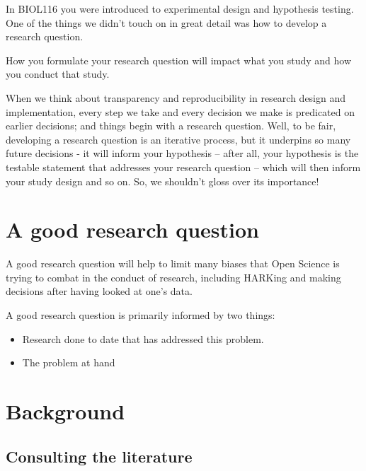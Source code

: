 \documentclass[
]{book}
\providecommand{\tightlist}{%
  \setlength{\itemsep}{0pt}\setlength{\parskip}{0pt}}
\begin{document}
In BIOL116 you were introduced to experimental design and hypothesis testing. One of the things we didn't touch on in great detail was how to develop a research question.

How you formulate your research question will impact what you study and how you conduct that study.

When we think about transparency and reproducibility in research design and implementation, every step we take and every decision we make is predicated on earlier decisions; and things begin with a research question. Well, to be fair, developing a research question is an iterative process, but it underpins so many future decisions - it will inform your hypothesis -- after all, your hypothesis is the testable statement that addresses your research question -- which will then inform your study design and so on. So, we shouldn't gloss over its importance!

\hypertarget{a-good-research-question}{%
\section*{A good research question}\label{a-good-research-question}}

A good research question will help to limit many biases that Open Science is trying to combat in the conduct of research, including HARKing and making decisions after having looked at one's data.

A good research question is primarily informed by two things:

\begin{itemize}
\tightlist
\item
  Research done to date that has addressed this problem.
\item
  The problem at hand
\end{itemize}

\hypertarget{background}{%
\section*{Background}\label{background}}

\hypertarget{consulting-the-literature}{%
\subsection*{Consulting the literature}\label{consulting-the-literature}}
\end{document}
